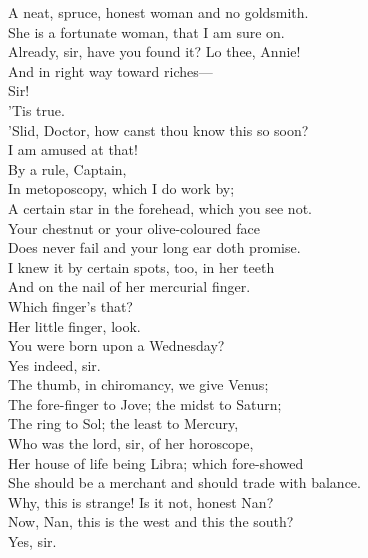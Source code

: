 \documentclass[a4paper,oneside,12pt]{memoir}
\begin{document}
\begin{drama*}
A neat, spruce, honest woman and no goldsmith.\\
\subtlespeaks She is a fortunate woman, that I am sure on.\\
\facespeaks Already, sir, have you found it? Lo thee, Annie!\\
\subtlespeaks And in right way toward riches---\\
\facespeaks {} Sir!\\
\subtlespeaks {} 'Tis true.\\
\facespeaks 'Slid, Doctor, how canst thou know this so soon?\\
I am amused at that!\\
\subtlespeaks {} By a rule, Captain,\\
In metoposcopy, which I do work by;\\
A certain star in the forehead, which you see not.\\
Your chestnut or your olive-coloured face\\
Does never fail and your long ear doth promise.\\
I knew it by certain spots, too, in her teeth\\
And on the nail of her mercurial finger.\\
\facespeaks Which finger's that?\\
\subtlespeaks {} Her little finger, look.\\
You were born upon a Wednesday?\\
\druggerspeaks {} Yes indeed, sir.\\
\subtlespeaks The thumb, in chiromancy, we give Venus;\\
The fore-finger to Jove; the midst to Saturn;\\
The ring to Sol; the least to Mercury,\\
Who was the lord, sir, of her horoscope,\\
Her house of life being Libra; which fore-showed\\
She should be a merchant and should trade with balance.\\
\facespeaks Why, this is strange! Is it not, honest Nan?\\
\subtlespeaks Now, Nan, this is the west and this the south?\\
\druggerspeaks Yes, sir.\\

\end{drama*}
\end{document}

